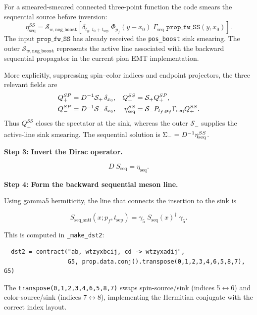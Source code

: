 \documentclass[11pt,a4paper]{article}
\newcommand{\code}[1]{\texttt{#1}}
\begin{document}
For a smeared-smeared connected three-point function the code smears the
sequential source before inversion:
\begin{equation}\label{eq:eta_seq_smeared}
  \eta_{\text{seq}}^{SS}
  =
  \mathcal{S}_{w,\mathtt{neg\_boost}}
  \left[
    \delta_{t_y,\, t_0 + t_{\text{sep}}}\;
    \Phi_{p_f}(y - x_0)\;
    \Gamma_{\text{seq}}\;
    \mathtt{prop\_fw\_SS}(y, x_0)
  \right].
\end{equation}
The input \(\mathtt{prop\_fw\_SS}\) has already received the
\code{pos\_boost} sink smearing.  The outer
\(\mathcal{S}_{w,\mathtt{neg\_boost}}\) represents the active line associated
with the backward sequential propagator in the current pion EMT implementation.

More explicitly, suppressing spin--color indices and endpoint projectors, the
three relevant fields are
\begin{align}
  Q_+^{SP} &= D^{-1}\mathcal S_+\,\delta_{x_0},
  &Q_+^{SS} &= \mathcal S_+ Q_+^{SP},\\
  Q_-^{SP} &= D^{-1}\mathcal S_-\,\delta_{x_0},
  &\eta_{\rm seq}^{SS}
    &= \mathcal S_- P_{t_f,\mathbf p_f}\Gamma_{\rm seq}Q_+^{SS}.
\end{align}
Thus \(Q_+^{SS}\) closes the spectator at the sink, whereas the outer
\(\mathcal S_-\) supplies the active-line sink smearing.  The sequential
solution is \(\Sigma_-=D^{-1}\eta_{\rm seq}^{SS}\).

\textbf{Step 3: Invert the Dirac operator.}

\begin{equation}
  D\; S_{\text{seq}} = \eta_{\text{seq}}.
\end{equation}

\textbf{Step 4: Form the backward sequential meson line.}

Using gamma5 hermiticity, the line that connects the insertion to the sink is

\begin{equation}\label{eq:S_seq_anti}
  S_{\text{seq\_anti}}(x; p_f, t_{\text{sep}})
    = \gamma_5\; S_{\text{seq}}(x)^\dagger\; \gamma_5.
\end{equation}

This is computed in \code{\_make\_dst2}:
\begin{verbatim}
  dst2 = contract("ab, wtzyxbcij, cd -> wtzyxadij",
                  G5, prop.data.conj().transpose(0,1,2,3,4,6,5,8,7), G5)
\end{verbatim}
The \code{transpose(0,1,2,3,4,6,5,8,7)} swaps spin-source/sink (indices 5$\leftrightarrow$6) and color-source/sink (indices 7$\leftrightarrow$8), implementing the Hermitian conjugate with the correct index layout.
\end{document}
